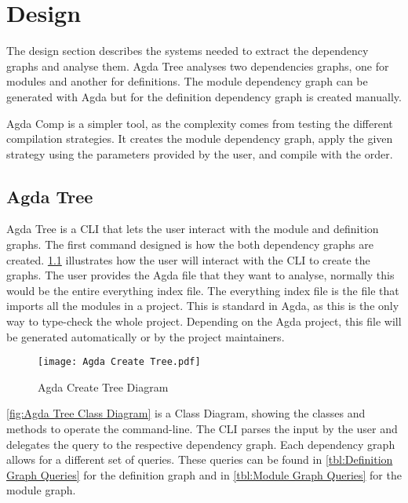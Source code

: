 
\chapter{Design}

The design section describes the systems needed to extract the dependency
graphs and analyse them. Agda Tree analyses two dependencies graphs, one for
modules and another for definitions. The module dependency graph can be
generated with Agda but for the definition dependency graph is created
manually.

Agda Comp is a simpler tool, as the complexity comes from testing the different
compilation strategies. It creates the module dependency graph, apply the
given strategy using the parameters provided by the user, and compile with the
order. 

\pagebreak

\section{Agda Tree}

Agda Tree is a CLI that lets the user interact with the
module and definition graphs. The first command designed is how the both
dependency graphs are created. \cref{fig:Agda Create Tree Diagram} illustrates
how the user will interact with the CLI to create the graphs. The user provides
the Agda file that they want to analyse, normally this would be the entire
everything index file. The everything index file is the file that imports all
the modules in a project. This is standard in Agda, as this is the only way to
type-check the whole project. Depending on the Agda project, this file will be
generated automatically or by the project maintainers.
\begin{figure}[H]
    \centering
    \texttt{[image: Agda Create Tree.pdf]}
    \caption{Agda Create Tree Diagram}
    \label{fig:Agda Create Tree Diagram}
\end{figure} 

\pagebreak

\cref{fig:Agda Tree Class Diagram} is a Class Diagram, showing the classes and
methods to operate the command-line. The CLI parses the input by the user and
delegates the query to the respective dependency graph. Each dependency graph
allows for a different set of queries. These queries can be found in
\cref{tbl:Definition Graph Queries} for the definition graph and in
\cref{tbl:Module Graph Queries} for the module graph.

